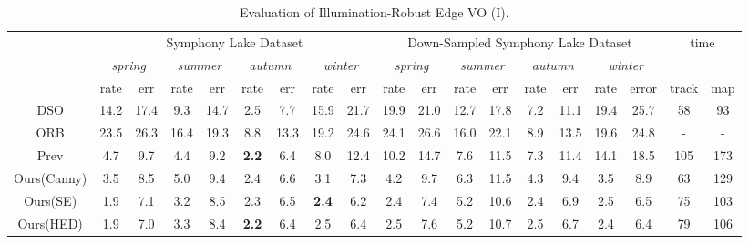 \begin{table}
	\centering
	\caption[Evaluation of Illumination-Robust Edge VO (I)]{Evaluation of Illumination-Robust Edge VO (I).
	\label{tbl:edge_evalrobustness}}
	\begin{tabular}{c|cccccccc|cccccccc|cc}
\hline
            & \multicolumn{8}{c|}{Symphony Lake Dataset}                                                                                                & \multicolumn{8}{c|}{Down-Sampled Symphony Lake Dataset }   &  \multicolumn{2}{c}{time}  \\
            & \multicolumn{2}{c}{{\em spring}} & \multicolumn{2}{c}{{\em summer}} & \multicolumn{2}{c}{{\em autumn}} & \multicolumn{2}{c|}{{\em winter}} & \multicolumn{2}{c}{{\em spring}} & \multicolumn{2}{c}{{\em summer}} & \multicolumn{2}{c}{{\em autumn}} & \multicolumn{2}{c|}{{\em winter}} & \multicolumn{2}{c}{ }            \\ 
            & rate          & err         & rate          & err          & rate          & err         & rate           & err           & rate          & err          & rate          & err       & rate    & err   & rate   & error   &     track & map                  \\ \hline
DSO\cite{engel2017direct}                               &  14.2  & 17.4 & 9.3    &  14.7  & 2.5  & 7.7   & 15.9  & 21.7  & 19.9 & 21.0 & 12.7  & 17.8 & 7.2 & 11.1 & 19.4 & 25.7 & 58  & 93\\
ORB\cite{mur2017orb}                                      &  23.5 & 26.3 & 16.4  &  19.3  & 8.8  & 13.3 & 19.2  & 24.6 & 24.1 & 26.6 & 16.0 & 22.1 & 8.9 & 13.5 & 19.6 & 24.8 & - & -\\
Prev                        &  4.7   & 9.7  & 4.4    &  9.2   &  \textbf{2.2}  & 6.4  & 8.0  & 12.4   & 10.2 & 14.7  & 7.6   & 11.5   & 7.3 & 11.4 & 14.1 &  18.5& 105 & 173\\ \hline 
Ours(Canny\cite{canny1987computational}) 	&  3.5   & 8.5    & 5.0    &  9.4  &  2.4  & 6.6  &  3.1   &  7.3   & 4.2  &  9.7  & 6.3    & 11.5   & 4.3 & 9.4 & 3.5 &  8.9& 63 & 129\\ 
Ours(SE\cite{dollar2013structured}) 				&  1.9    & 7.1   & 3.2    &  8.5   &  2.3  & 6.5   &  \textbf{2.4}   &  6.2   &  2.4   & 7.4   & 5.2    &  10.6   & 2.4 & 6.9 &  2.5 & 6.5 & 75 & 103\\ 
Ours(HED\cite{xie2015holistically}) 				&  1.9    & 7.0    &  3.3    &   8.4   &  \textbf{2.2}  &  6.4   &  2.5   &   6.4   & 2.5   & 7.6  &  5.2    & 10.7    &  2.5 &  6.7 &  2.4 &  6.4 &  79 & 106\\ \hline

\end{tabular}
\end{table}
